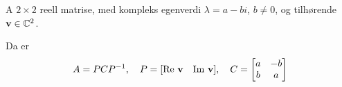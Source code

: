 A $2\times 2$ reell matrise,
med kompleks egenverdi $\lambda = a - bi$, $b\neq 0$,
og tilhørende $\mathbf{v} \in \mathbb{C}^2$.

Da er
$$A = PCP^{-1}, \quad P=[\text{Re}\ {\mathbf{v}}\quad\text{Im}\ {\mathbf{v}}], \quad C = 
  \begin{bmatrix}
    a & -b \\
    b & a
  \end{bmatrix}
$$
